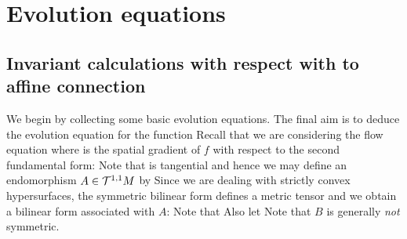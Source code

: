 \section{Evolution equations}
\subsection{Invariant calculations with respect with to affine connection}
We begin by collecting some basic evolution equations. The final aim is to deduce the evolution equation for the function
 Recall that we are considering the flow equation
where
is the spatial gradient of $f$ with respect to the second fundamental form:
Note that
is tangential and hence we may define an endomorphism $A\in \mathcal{T}^{1,1}M$ by
Since we are dealing with strictly convex hypersurfaces, the symmetric bilinear form
defines a metric tensor and we obtain a bilinear form associated with $A$:
 Note that
Also let
Note that $B$ is generally \emph{not} symmetric.
